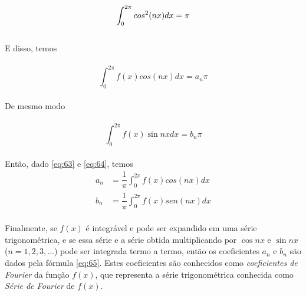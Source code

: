 \begin{equation}
\notag
    \int_{0}^{2\pi}cos^2(nx)dx = \pi
\end{equation}
\\ 
E disso, temos\\
\\
\begin{equation}
\label{eq:63}
    \int_{0}^{2\pi}f(x)cos(nx)dx = a_n\pi
\end{equation}
\\
De mesmo modo\\
\\
\begin{equation}
\label{eq:64}
    \int_{0}^{2\pi}f(x)\sin{nx}dx = b_n\pi
\end{equation}
\\
Então, dado \ref{eq:63} e \ref{eq:64}, temos\\
\begin{equation}
\label{eq:65}
    \begin{split}
        a_n &= \dfrac{1}{\pi}\int_{0}^{2\pi}f(x)cos(nx)dx\\
        b_n &= \dfrac{1}{\pi}\int_{0}^{2\pi}f(x)sen(nx)dx
    \end{split}
\end{equation}
\\
Finalmente, se $f(x)$ é integrável e pode ser expandido em uma série trigonométrica,
e se essa série e a série obtida multiplicando por $\cos{nx}$ e $\sin{nx}$ ($n = 1, 2, 3, ...$)
pode ser integrada termo a termo, então os coeficientes $a_n$ e $b_n$ são dados pela
fórmula \ref{eq:65}. Estes coeficientes são conhecidos como \textit{coeficientes de Fourier}
da função $f(x)$, que representa a série trigonométrica conhecida como \textit{Série de
Fourier} de $f(x)$.\\

